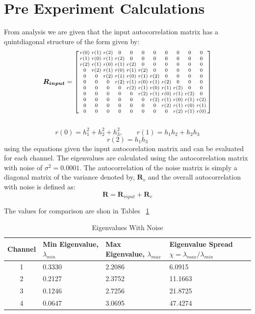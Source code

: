 \documentclass[journal]{IEEEtran}
\begin{document}
\section{Pre Experiment Calculations}
From analysis we are given that the input autocorrelation matrix has
a quintdiagonal structure of the form given by:\\
\[
\boldsymbol{R_{input}}=
    \begin{bsmallmatrix}
    r(0) & r(1) & r(2) & 0 & 0 & 0 & 0 & 0 & 0 & 0 & 0\\
    r(1) & r(0) & r(1) & r(2) & 0 & 0 & 0 & 0 & 0 & 0 & 0\\
    r(2) & r(1) & r(0) & r(1) & r(2) & 0 & 0 & 0 & 0 & 0 & 0\\
    0 & r(2) & r(1) & r(0) & r(1) & r(2) & 0 & 0 & 0 & 0 & 0\\
    0 & 0 & r(2) & r(1) & r(0) & r(1) & r(2) & 0 & 0 & 0 & 0\\
    0 & 0 & 0 & r(2) & r(1) & r(0) & r(1) & r(2) & 0 & 0 & 0\\
    0 & 0 & 0 & 0 & r(2) & r(1) & r(0) & r(1) & r(2) & 0 & 0\\
    0 & 0 & 0 & 0 & 0 & r(2) & r(1) & r(0) & r(1) & r(2) & 0\\
    0 & 0 & 0 & 0 & 0 & 0 & r(2) & r(1) & r(0) & r(1) & r(2)\\
    0 & 0 & 0 & 0 & 0 & 0 & 0 & r(2) & r(1) & r(0) & r(1)\\
    0 & 0 & 0 & 0 & 0 & 0 & 0 & 0 & r(2) & r(1) & r(0)\\
  \end{bsmallmatrix}
\]
\\
$$  r(0) = h_1^2 + h_2^2 + h_3^2, \qquad  r(1) = h_1h_2 + h_2h_3 $$
$$  r(2) = h_1h_3 $$
using the equations given the input autocorelation matrix and can be evaluated
for each channel.
The eigenvalues are calculated using the autocorrelation matrix with noise of $ \sigma^2 = 0.0001$.
The autocorrelation of the noise matrix is simply a diagonal matrix of the variance denoted by, $\boldsymbol{R}_v$ and the overall
autocorrelation with noise is defined as:
$$ \boldsymbol{R} = \boldsymbol{R}_{input} + \boldsymbol{R}_v$$

The values for comparison are shon in Tables ~\ref{table:eigenspreadn}
\linespread{0.8}
\begin{table}[H]
  \centering
  \captionsetup{font = small}
 \begin{tabular}{ | c || p{1.5cm} | p{1.5cm} | p{1.5cm} |}
    \hline
    Channel & Min Eigenvalue, $\lambda_{min}$  & Max Eigenvalue, $\lambda_{max}$ & Eigenvalue Spread $\chi = \lambda_{max}/\lambda_{min}$\\
    \hline\hline
    1 & 0.3330 & 2.2086 & 6.0915 \\
    \hline
    2 & 0.2127 & 2.3752 & 11.1663 \\
    \hline
    3 & 0.1246 & 2.7256 & 21.8725 \\
    \hline
    4 & 0.0647 & 3.0695 & 47.4274 \\
    \hline
  \end{tabular}
  \caption{Eigenvalues With Noise}
  \label{table:eigenspreadn}
\end{table}
\end{document}
